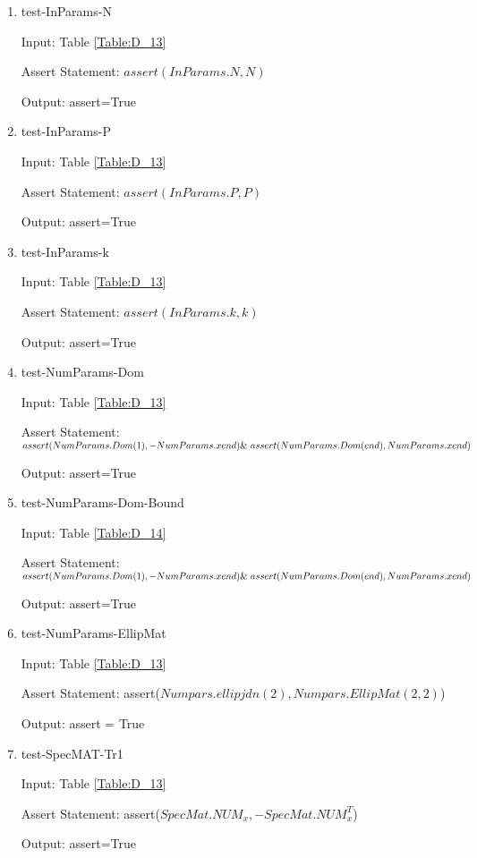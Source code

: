 \documentclass[12pt, titlepage]{article}
\begin{document}
\begin{enumerate} 
	\item{test-InParams-N\\} \label{inparamsN} 
	
	Input: Table \ref{Table:D_13}
	
	Assert Statement: $assert(InParams.N,N)$
	
	Output: assert=True 
	
	\item{test-InParams-P\\} \label{inparamsP} 
	
	Input: Table \ref{Table:D_13}
	
	Assert Statement: $assert(InParams.P,P)$
	
	Output: assert=True 
	
	\item{test-InParams-k\\} \label{inparamsK} 
	
	Input: Table \ref{Table:D_13}
	
	Assert Statement: $assert(InParams.k,k)$
	
	Output: assert=True 
	
	\item{test-NumParams-Dom\\} \label{numparamsdom}
	
	Input: Table \ref{Table:D_13}
	
	Assert Statement: $assert(NumParams.Dom(1),-NumParams.xend)  \\
	 \& \ 
	assert(NumParams.Dom(end),NumParams.xend)$
	
	Output: assert=True 
	
	\item{test-NumParams-Dom-Bound\\} \label{numparamsdombound}
	
	Input: Table \ref{Table:D_14}
	
	Assert Statement: $assert(NumParams.Dom(1),-NumParams.xend)  \\
	\& \ 
	assert(NumParams.Dom(end),NumParams.xend)$ 
	
	Output: assert=True 
	
	\item{test-NumParams-EllipMat\\} \label{numparamsellipmat}
	
	Input: Table \ref{Table:D_13} 
	
	Assert Statement: assert($Numpars.ellipjdn(2) , Numpars.EllipMat(2,2)$)
	
	Output: assert = True 
	
	\item{test-SpecMAT-Tr1\\} \label{specmattr1}

	Input: Table \ref{Table:D_13}
	
	Assert Statement: assert($SpecMat.NUM_{x} , -SpecMat.NUM_{x}^{T}$) 
	
	Output: assert=True 
	
\end{enumerate}
\end{document}
